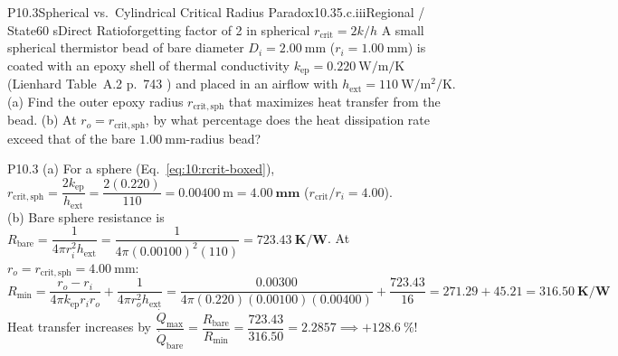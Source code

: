 \begin{problem}{P10.3}{Spherical vs.\ Cylindrical Critical Radius Paradox}{10.3}{5.c.iii}{Regional / State}{60 s}{Direct Ratio}{forgetting factor of 2 in spherical $r_{\mathrm{crit}} = 2k/h$}
A small spherical thermistor bead of bare diameter $D_i = \SI{2.00}{\milli\meter}$ ($r_i = \SI{1.00}{\milli\meter}$) is coated with an epoxy shell of thermal conductivity $k_{\mathrm{ep}} = \SI{0.220}{\watt\per\meter\per\kelvin}$ (Lienhard Table~A.2 p.~743 ) and placed in an airflow with $h_{\mathrm{ext}} = \SI{110}{\watt\per\square\meter\per\kelvin}$. (a) Find the outer epoxy radius $r_{\mathrm{crit,sph}}$ that maximizes heat transfer from the bead. (b) At $r_o = r_{\mathrm{crit,sph}}$, by what percentage does the heat dissipation rate exceed that of the bare $\SI{1.00}{\milli\meter}$-radius bead?
\end{problem}
\begin{solution}{P10.3}
(a) For a sphere (Eq.~\ref{eq:10:rcrit-boxed}), $r_{\mathrm{crit,sph}} = \dfrac{2 k_{\mathrm{ep}}}{h_{\mathrm{ext}}} = \dfrac{2(0.220)}{110} = \SI{0.00400}{\meter} = \mathbf{\SI{4.00}{\milli\meter}}$ ($r_{\mathrm{crit}}/r_i = 4.00$).\\
(b) Bare sphere resistance is $R_{\mathrm{bare}} = \dfrac{1}{4\pi r_i^2 h_{\mathrm{ext}}} = \dfrac{1}{4\pi(0.00100)^2(110)} = \mathbf{\SI{723.43}{\kelvin\per\watt}}$. At $r_o = r_{\mathrm{crit,sph}} = \SI{4.00}{\milli\meter}$:
\[
  R_{\min} = \frac{r_o - r_i}{4\pi k_{\mathrm{ep}} r_i r_o} + \frac{1}{4\pi r_o^2 h_{\mathrm{ext}}} = \frac{0.00300}{4\pi(0.220)(0.00100)(0.00400)} + \frac{723.43}{16} = 271.29 + 45.21 = \mathbf{\SI{316.50}{\kelvin\per\watt}}
\]
Heat transfer increases by $\dfrac{\dot{Q}_{\max}}{\dot{Q}_{\mathrm{bare}}} = \dfrac{R_{\mathrm{bare}}}{R_{\min}} = \dfrac{723.43}{316.50} = 2.2857 \implies \mathbf{+\SI{128.6}{\percent}}$!
\end{solution}


